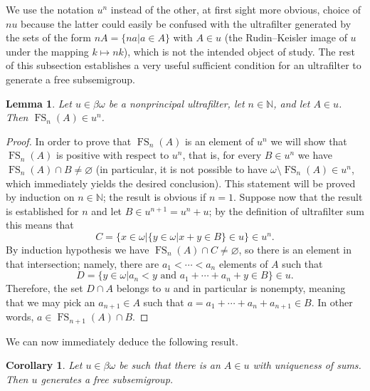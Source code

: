\documentclass[10pt]{amsart}
\DeclareMathOperator{\fs}{FS}
\newtheorem{lemma}[theorem]{Lemma}
\newtheorem{corollary}[theorem]{Corollary}
\theoremstyle{definition}
\theoremstyle{remark}
\begin{document}
We use the notation $u^n$ instead of the other, at first sight more obvious, choice of $nu$ because the latter could easily be confused with the ultrafilter generated by the sets of the form $nA=\{na\big|a\in A\}$ with $A\in u$ (the Rudin--Keisler image of $u$ under the mapping $k\longmapsto nk$), which is not the intended object of study. The rest of this subsection establishes a very useful sufficient condition for an ultrafilter to generate a free subsemigroup.

\begin{lemma}\label{lem:fsnainun}
Let $u\in\beta\omega$ be a nonprincipal ultrafilter, let $n\in\mathbb N$, and let $A\in u$. Then $\fs_n(A)\in u^n$.
\end{lemma}

\begin{proof}
In order to prove that $\fs_n(A)$ is an element of $u^n$ we will show that $\fs_n(A)$ is positive with respect to $u^n$, that is, for every $B\in u^n$ we have $\fs_n(A)\cap B\neq\varnothing$ (in particular, it is not possible to have $\omega\setminus\fs_n(A)\in u^n$, which immediately yields the desired conclusion). This statement will be proved by induction on $n\in\mathbb N$; the result is obvious if $n=1$. Suppose now that the result is established for $n$ and let $B\in u^{n+1}=u^n+u$; by the definition of ultrafilter sum this means that
    \begin{equation*}
        C=\{x\in\omega\big|\{y\in\omega\big|x+y\in B\}\in u\}\in u^n.
    \end{equation*}
By induction hypothesis we have $\fs_n(A)\cap C\neq\varnothing$, so there is an element in that intersection; namely, there are $a_1<\cdots<a_n$ elements of $A$ such that
    \begin{equation*}
        D=\{y\in\omega\big|a_n<y\text{ and }a_1+\cdots+a_n+y\in B\}\in u.
    \end{equation*}
Therefore, the set $D\cap A$ belongs to $u$ and in particular is nonempty, meaning that we may pick an $a_{n+1}\in A$ such that $a=a_1+\cdots+a_n+a_{n+1}\in B$. In other words, $a\in\fs_{n+1}(A)\cap B$.
\end{proof}

We can now immediately deduce the following result.

\begin{corollary}
    Let $u\in\beta\omega$ be such that there is an $A\in u$ with uniqueness of sums. Then $u$ generates a free subsemigroup.
\end{corollary}
\end{document}
